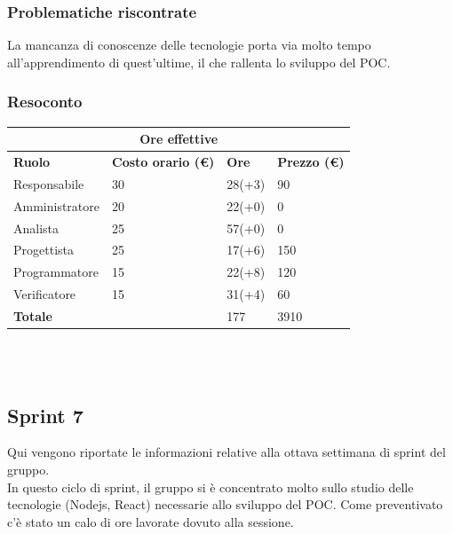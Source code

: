 \documentclass[9pt]{article}
\begin{document}
\subsubsection{Problematiche riscontrate}
La mancanza di conoscenze delle tecnologie porta via molto tempo all'apprendimento di quest'ultime, il che rallenta lo sviluppo del POC.
\subsubsection{Resoconto}
\begin{center}
	\begin{tabularx}{\textwidth}{|X|X|X|X|}
		\hline
		\multicolumn{4}{|c|}{\textbf{Ore effettive}}                                      \\
		\hline
		\hline
		\textbf{Ruolo}  & \textbf{Costo orario (\euro)} & \textbf{Ore} & \textbf{Prezzo (\euro)} \\
		\hline
		Responsabile    & 30                            & 28(+3)       & 90                      \\
		\hline
		Amministratore  & 20                            & 22(+0)       & 0                       \\
		\hline
		Analista        & 25                            & 57(+0)       & 0                       \\
		\hline
		Progettista     & 25                            & 17(+6)       & 150                     \\
		\hline
		Programmatore   & 15                            & 22(+8)       & 120                     \\
		\hline
		Verificatore    & 15                            & 31(+4)       & 60                      \\
		\hline
		\hline
		\textbf{Totale} &                               & 177          & 3910                    \\
		\hline
	\end{tabularx}\\[8pt]
	\mbox{}\\
\end{center}

\subsection{Sprint 7}
Qui vengono riportate le informazioni relative alla ottava settimana di sprint del gruppo. \\
In questo ciclo di sprint, il gruppo si è concentrato molto sullo studio delle tecnologie (Nodejs, React) necessarie allo sviluppo del POC. Come preventivato c'è stato un calo di ore lavorate dovuto alla sessione.\\
\end{document}
